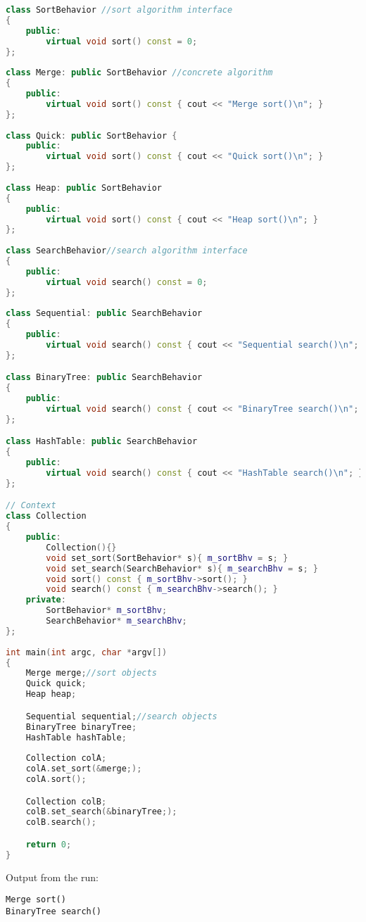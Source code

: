 \documentclass{book}
\begin{document}
\begin{lstlisting}[caption={Strategy Pattern Sample 1}, language=C++]
class SortBehavior //sort algorithm interface
{
    public:
        virtual void sort() const = 0;
};
 
class Merge: public SortBehavior //concrete algorithm
{
    public:
        virtual void sort() const { cout << "Merge sort()\n"; }
};
 
class Quick: public SortBehavior {
    public:
        virtual void sort() const { cout << "Quick sort()\n"; }
};
 
class Heap: public SortBehavior
{
    public:
        virtual void sort() const { cout << "Heap sort()\n"; }
};
 
class SearchBehavior//search algorithm interface 
{
    public:
        virtual void search() const = 0;
};
 
class Sequential: public SearchBehavior 
{
    public:
        virtual void search() const { cout << "Sequential search()\n"; }
};

class BinaryTree: public SearchBehavior 
{
    public:
        virtual void search() const { cout << "BinaryTree search()\n"; }
};

class HashTable: public SearchBehavior 
{
    public:
        virtual void search() const { cout << "HashTable search()\n"; }
};

// Context
class Collection 
{
    public:
        Collection(){}
        void set_sort(SortBehavior* s){ m_sortBhv = s; }
        void set_search(SearchBehavior* s){ m_searchBhv = s; }
        void sort() const { m_sortBhv->sort(); }
        void search() const { m_searchBhv->search(); }
    private:
        SortBehavior* m_sortBhv;
        SearchBehavior* m_searchBhv;
};
 
int main(int argc, char *argv[])
{
    Merge merge;//sort objects
    Quick quick;
    Heap heap;

    Sequential sequential;//search objects
    BinaryTree binaryTree;
    HashTable hashTable;
 
    Collection colA;
    colA.set_sort(&merge;);
    colA.sort();

    Collection colB;
    colB.set_search(&binaryTree;);
    colB.search();

    return 0;
}
\end{lstlisting}
Output from the run:
\begin{verbatim}
Merge sort()
BinaryTree search()
\end{verbatim}
\end{document}
